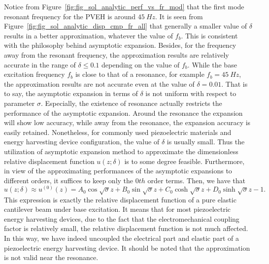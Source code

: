 \documentclass{article}
\begin{document}
Notice from Figure~\ref{fig:fig_sol_analytic_perf_vs_fr_mod} that the first mode resonant frequency for the PVEH is around $45\ Hz$. It is seen from Figure~\ref{fig:fig_sol_analytic_disp_cmp_fr_all} that generally a smaller value of $\delta$ results in a better approximation, whatever the value of $f_b$. This is consistent with the philosophy behind asymptotic expansion. Besides, for the frequency away from the resonant frequency, the approximation results are relatively accurate in the range of $\delta \leq 0.1$ depending on the value of $f_b$. While the base excitation frequency $f_b$ is close to that of a resonance, for example $f_b = 45\ Hz$, the approximation results are not accurate even at the value of $\delta = 0.01$. That is to say, the asymptotic expansion in terms of $\delta$ is not uniform with respect to parameter $\sigma$. Especially, the existence of resonance actually restricts the performance of the asymptotic expansion. Around the resonance the expansion will show low accuracy, while away from the resonance, the expansion accuracy is easily retained. Nonetheless, for commonly used piezoelectric materials and energy harvesting device configuration, the value of $\delta$ is usually small. Thus the utilization of asymptotic expansion method to approximate the dimensionless relative displacement function $u(z;\delta)$ is to some degree feasible. Furthermore, in view of the approximating performances of the asymptotic expansions to different orders, it suffices to keep only the $0th$ order terms. Then, we have that 
\begin{equation}
    u(z;\delta) \approx u^{(0)}(z) = A_0 \cos{\sqrt{\sigma}z} + B_0 \sin{\sqrt{\sigma}z} + C_0 \cosh{\sqrt{\sigma}z} + D_0 \sinh{\sqrt{\sigma}z} - 1.
\end{equation}
This expression is exactly the relative displacement function of a pure elastic cantilever beam under base excitation. It means that for most piezoelectric energy harvesting devices, due to the fact that the electromechanical coupling factor is relatively small, the relative displacement function is not much affected. In this way, we have indeed uncoupled the electrical part and elastic part of a piezoelectric energy harvesting device. It should be noted that the approximation is not valid near the resonance.
\end{document}
